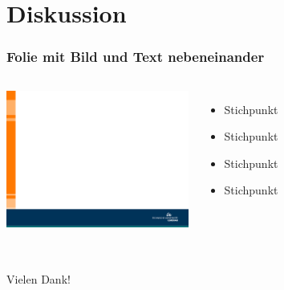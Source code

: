 \section{Diskussion}
\begin{frame}
\frametitle{Folie mit Bild und Text nebeneinander}
\begin{columns}
    \column{6cm}
    \vskip5mm
 	    \includegraphics[width=6.0cm]{style/images/master_background}
    \vskip5mm
    \column{5cm}
    \vspace{0cm}
	\begin{itemize}
	 	 \itemsep1.2em
   		 \item Stichpunkt
      	 \item Stichpunkt
       	 \item Stichpunkt
     	 \item Stichpunkt
       	\end{itemize}
 \end{columns}
\end{frame}

\begin{frame}[c]
\frametitle{}
\vskip5mm
\begin{columns}
    \column{12cm}
 	\centering
 	\vspace{0.5cm}
 	\begin{center}
 		\huge{Vielen Dank!}
 	\end{center}
 \end{columns}
\end{frame}




